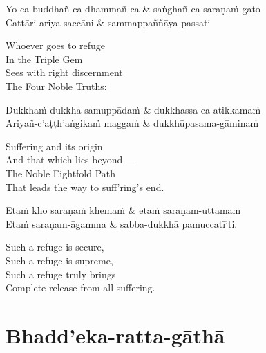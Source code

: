 \begin{twochants}
Yo ca buddhañ-ca dhammañ-ca & saṅghañ-ca saraṇaṁ gato\\
Cattāri ariya-saccāni & sammappaññāya passati\\
\end{twochants}

\begin{english}
  Whoever goes to refuge\\
  In the Triple Gem\\
  Sees with right discernment\\
  The Four Noble Truths:
\end{english}

\begin{twochants}
Dukkhaṁ dukkha-samuppādaṁ & dukkhassa ca atikkamaṁ\\
Ariyañ-c'aṭṭh'aṅgikaṁ maggaṁ & dukkhūpasama-gāminaṁ\\
\end{twochants}

\begin{english}
  Suffering and its origin\\
  And that which lies beyond ---\\
  The Noble Eightfold Path\\
  That leads the way to suff'ring's end.
\end{english}

\begin{twochants}
Etaṁ kho saraṇaṁ khemaṁ & etaṁ saraṇam-uttamaṁ\\
Etaṁ saraṇam-āgamma & sabba-dukkhā pamuccatī'ti.
\end{twochants}

\begin{english}
  Such a refuge is secure,\\
  Such a refuge is supreme,\\
  Such a refuge truly brings\\
  Complete release from all suffering.
\end{english}


\section{Bhadd'eka-ratta-gāthā}




